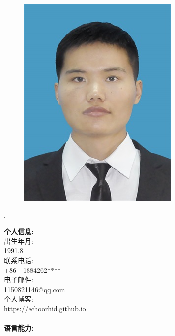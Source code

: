 \documentclass[a4paper,12pt,final]{memoir}
\newcommand{\myThemeColor}{RoyalBlue}
\newcommand{\SmallSep}{\vspace{0.9em}}
\newcommand{\CVItem}[1]
	{\textbf{\color{\myThemeColor} #1}}
\begin{document}
\begin{CJK*}{UTF8}{gbsn}%
\begin{figure}
	\hfill
	\includegraphics[width=0.8\columnwidth]{photo}
	\vspace{-7cm}
\end{figure}
\begin{flushright}\footnotesize
.\\
\vskip 6cm
    \raggedright
	\CVItem{{\large 个人信息:}}\\
\SmallSep
    出生年月:\\
    1991.8  \\
    \SmallSep
    联系电话:\\
	+86 - 1884262****  \\
\SmallSep
	电子邮件:\\
	\href{mailto:1150821146@qq.com}{1150821146@qq.com}  \\
\SmallSep
	个人博客:\\
	\href{https://echoorchid.github.io/}{https://echoorhid.github.io} \\
	
	\SmallSep
\SmallSep
\SmallSep
	\CVItem{{\large \\语言能力:}}\\


\end{flushright}
\end{CJK*}
\end{document}

